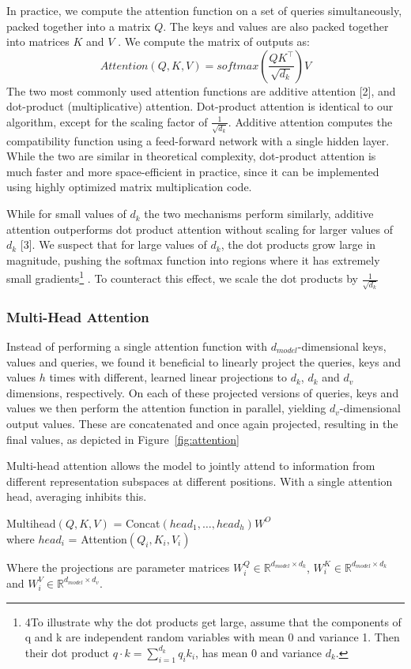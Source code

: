 \documentclass{article}
\begin{document}
\setlength{\parskip}{1em}
\noindent
In practice, we compute the attention function on a set of queries simultaneously, packed together
into a matrix $Q$. The keys and values are also packed together into matrices $K$ and $V$ . We compute
the matrix of outputs as:
\begin{equation}
    Attention(Q, K, V) = softmax(\frac{QK^\top}{\sqrt{d_k}}) V
\end{equation}
The two most commonly used attention functions are additive attention [2], and dot-product (multiplicative) attention. Dot-product attention is identical to our algorithm, except for the scaling factor
of $\frac{1}{\sqrt{d_k}}$. Additive attention computes the compatibility function using a feed-forward network with
a single hidden layer. While the two are similar in theoretical complexity, dot-product attention is
much faster and more space-efficient in practice, since it can be implemented using highly optimized
matrix multiplication code.

\setlength{\parskip}{1em}
\noindent
While for small values of $d_k$ the two mechanisms perform similarly, additive attention outperforms
dot product attention without scaling for larger values of $d_k$ [3]. We suspect that for large values of
$d_k$, the dot products grow large in magnitude, pushing the softmax function into regions where it has
extremely small gradients\footnote[4]{4To illustrate why the dot products get large, assume 
that the components of q and k are independent random
variables with mean 0 and variance 1. 
Then their dot product $ q \cdot k = \sum_{i = 1}^{d_k} q_i k_i $, has mean 0 and variance $d_k$.}
. To counteract this effect, we scale the dot products by $\frac{1}{\sqrt{d_k}}$

\subsubsection{Multi-Head Attention}
Instead of performing a single attention function with $d_{model}$-dimensional keys, values and queries,
we found it beneficial to linearly project the queries, keys and values $h$ times with different, learned
linear projections to $d_k$, $d_k$ and $d_v$ dimensions, respectively. On each of these projected versions of
queries, keys and values we then perform the attention function in parallel, yielding $d_v$-dimensional
output values. These are concatenated and once again projected, resulting in the final values, as
depicted in Figure~\ref{fig:attention}

\setlength{\parskip}{1em}
\noindent
Multi-head attention allows the model to jointly attend to information from different representation
subspaces at different positions. With a single attention head, averaging inhibits this.
\begin{center}
    Multihead$(Q, K, V)$ = Concat$(head_1, \ldots, head_h)W^O$\\
    where $head_i$ = Attention$(Q_i, K_i, V_i)$
\end{center}
Where the projections are parameter matrices 
$W_i^Q \in \mathbb{R}^{d_{model} \times d_k}$, 
$W_i^K \in \mathbb{R}^{d_{model} \times d_k}$ and 
$W_i^V \in \mathbb{R}^{d_{model} \times d_v}$.
\end{document}
